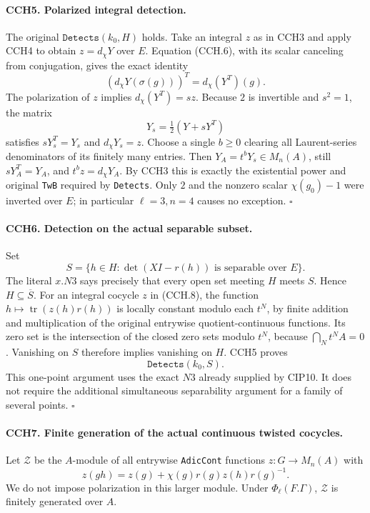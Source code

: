 \paragraph{CCH5. Polarized integral detection.}
\label{claim:CCH5}
The original $\texttt{Detects}(k_0,H)$ holds.
Take an integral $z$ as in CCH3 and apply CCH4 to obtain
$z=d_\chi Y$ over $E$.  Equation (CCH.6), with its scalar
canceling from conjugation, gives the exact identity
\[
             (d_\chi Y(\sigma(g)))^T=d_\chi(Y^T)(g).
 \tag{CCH.13}
\]
The polarization of $z$ implies $d_\chi(Y^T)=s z$.
Because $2$ is invertible and $s^2=1$, the matrix
\[
             Y_s=\tfrac12(Y+sY^T)
\]
satisfies $sY_s^T=Y_s$ and $d_\chi Y_s=z$.
Choose a single $b\ge0$ clearing all Laurent-series
denominators of its finitely many entries.  Then
$Y_A=t^bY_s\in M_n(A)$, still $sY_A^T=Y_A$, and
$t^b z=d_\chi Y_A$.  By CCH3 this is exactly the existential
power and original \texttt{TwB} required by \texttt{Detects}.
Only $2$ and the nonzero scalar $\chi(g_0)-1$ were inverted
over $E$; in particular $\ell=3,n=4$ causes no exception.
\hfill$\square$

\paragraph{CCH6. Detection on the actual separable subset.}
\label{claim:CCH6}
Set
\[
 S=\{h\in H:\det(XI-r(h))\text{ is separable over }E\}.
 \tag{CCH.14}
\]
The literal $x.N3$ says precisely that every open set meeting
$H$ meets $S$.  Hence $H\subseteq\overline S$.
For an integral cocycle $z$ in (CCH.8), the function
$h\mapsto\operatorname{tr}(z(h)r(h))$ is locally constant
modulo each $t^N$, by finite addition and multiplication of
the original entrywise quotient-continuous functions.
Its zero set is the intersection of the closed zero sets
modulo $t^N$, because $\bigcap_Nt^NA=0$.
Vanishing on $S$ therefore implies vanishing on $H$.
CCH5 proves
\[
                         \texttt{Detects}(k_0,S).
 \tag{CCH.15}
\]
This one-point argument uses the exact $N3$ already supplied
by CIP10.  It does not require the additional simultaneous
separability argument for a family of several points.
\hfill$\square$

\paragraph{CCH7. Finite generation of the actual continuous twisted cocycles.}
\label{claim:CCH7}
Let $\mathcal Z$ be the $A$-module of all entrywise
\texttt{AdicCont} functions $z:G\to M_n(A)$ with
\[
 z(gh)=z(g)+\chi(g)r(g)z(h)r(g)^{-1}.
 \tag{CCH.16}
\]
We do not impose polarization in this larger module.
Under $\Phi_\ell(F.\Gamma)$, $\mathcal Z$ is finitely generated
over $A$.

